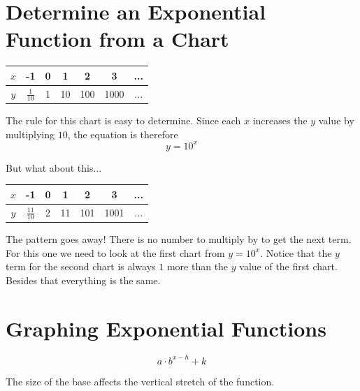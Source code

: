 \documentclass[12pt]{article}
\begin{document}
\section{Determine an Exponential Function from a Chart}

\begin{center}
{\renewcommand{\arraystretch}{2}
\begin{tabular}{c|c|c|c|c|c|c}

$x$ & -1 & 0 & 1 & 2 & 3  & ...\\ \hline
$y$ & $\frac{1}{10}$ & 1 & 10 & 100 & 1000 & ...\\ 

\end{tabular}} \quad
\end{center}

The rule for this chart is easy to determine. Since each $x$ increases the $y$ value by multiplying $10$, the equation is therefore $$y=10^x$$

But what about this...\\

\begin{center}
{\renewcommand{\arraystretch}{2}
\begin{tabular}{c|c|c|c|c|c|c}

$x$ & -1 & 0 & 1 & 2 & 3 & ... \\ \hline
$y$ & $\frac{11}{10}$ & 2 & 11 & 101 & 1001 & ... \\ 

\end{tabular}} \quad
\end{center}

The pattern goes away! There is no number to multiply by to get the next term. For this one we need to look at the first chart from $y=10^x$. Notice that the $y$ term for the second chart is always $1$ more than the $y$ value of the first chart. Besides that everything is the same.\\




\pagebreak


\section{Graphing Exponential Functions}

$$a\cdot b^{x-h}+k$$

The size of the base affects the vertical stretch of the function.\\
\end{document}
